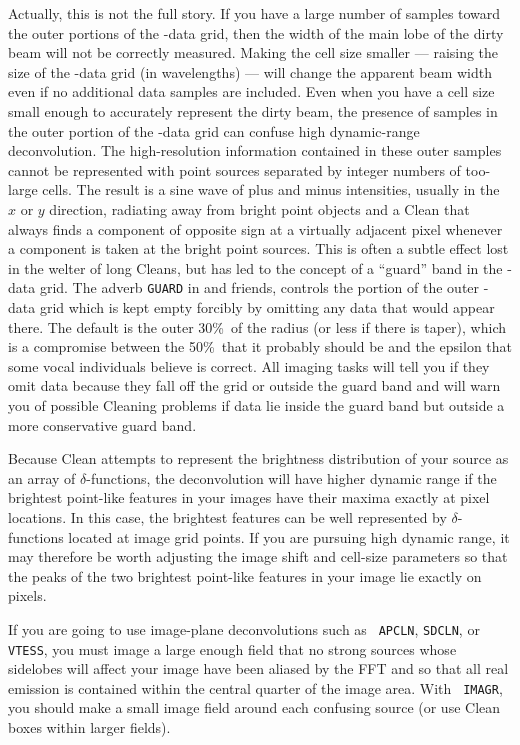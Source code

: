     Actually, this is not the full story.  If you have a large number
of samples toward the outer portions of the \uv-data grid, then the
width of the main lobe of the dirty beam will not be correctly
measured.  Making the cell size smaller --- raising the size of the
\uv-data grid (in wavelengths) --- will change the apparent beam width
even if no additional data samples are included.  Even when you have a
cell size small enough to accurately represent the dirty beam, the
presence of samples in the outer portion of the \uv-data grid can
confuse high dynamic-range deconvolution.  The high-resolution
information contained in these outer samples cannot be represented
with point sources separated by integer numbers of too-large cells.
The result is a sine wave of plus and minus intensities, usually in
the $x$ or $y$ direction, radiating away from bright point objects and
a Clean that always finds a component of opposite sign at a virtually
adjacent pixel whenever a component is taken at the bright point
sources.  This is often a subtle effect lost in the welter of long
Cleans, but has led to the concept of a ``guard'' band in the \uv-data
grid.  The adverb {\tt GUARD} in {\tt {}} and friends,
controls the portion of the outer \uv-data grid which is kept empty
forcibly by omitting any data that would appear there.  The default is
the outer 30\%\ of the radius (or less if there is taper), which is a
compromise between the 50\%\ that it probably should be and the
epsilon that some vocal individuals believe is correct.  All imaging
tasks will tell you if they omit data because they fall off the grid
or outside the guard band and will warn you of possible Cleaning
problems if data lie inside the guard band but outside a more
conservative guard band.

     Because Clean attempts to represent the brightness distribution
of your source as an array of $\delta$-functions, the deconvolution
will have higher dynamic range if the brightest point-like features in
your images have their maxima exactly at pixel locations.  In this
case, the brightest features can be well represented by
$\delta$-functions located at image grid points.  If you are pursuing
high dynamic range, it may therefore be worth adjusting the image
shift and cell-size parameters so that the peaks of the two brightest
point-like features in your image lie exactly on pixels.

      If you are going to use image-plane deconvolutions such as {\tt
APCLN}, {\tt SDCLN}, or {\tt VTESS}, you must image a large enough
field that no strong sources whose sidelobes will affect your image
have been aliased by the FFT and so that all real emission is
contained within the central quarter of the image area.  With {\tt
IMAGR}, you should make a small image field around each confusing
source (or use Clean boxes within larger fields).

